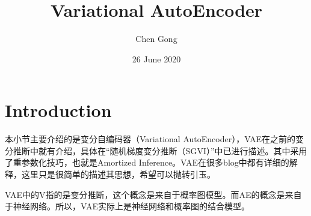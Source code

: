 \documentclass[a4paper]{article}
\title{Variational AutoEncoder}
\author{Chen Gong}
\date{26 June 2020}
\begin{document}
\maketitle
\tableofcontents
\newpage
\setcounter{page}{1} %
\clearpage
\maketitle

\maketitle

\section{Introduction}
本小节主要介绍的是变分自编码器（Variational AutoEncoder），VAE在之前的变分推断中就有介绍，具体在“随机梯度变分推断（SGVI）”中已进行描述。其中采用了重参数化技巧，也就是Amortized Inference。VAE在很多blog中都有详细的解释，这里只是很简单的描述其思想，希望可以抛转引玉。

VAE中的V指的是变分推断，这个概念是来自于概率图模型。而AE的概念是来自于神经网络。所以，VAE实际上是神经网络和概率图的结合模型。
\end{document}
